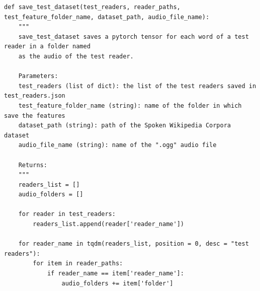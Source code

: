 \documentclass[12pt,a4paper,titlepage]{article}
\begin{document}
\begin{lstlisting}[language=iPython,firstnumber=208, caption=Funzione \texttt{save\_test\_dataset}, label=save_test_dataset,captionpos=b]
def save_test_dataset(test_readers, reader_paths, test_feature_folder_name, dataset_path, audio_file_name):
    """
    save_test_dataset saves a pytorch tensor for each word of a test reader in a folder named 
    as the audio of the test reader.

    Parameters:
    test_readers (list of dict): the list of the test readers saved in test_readers.json
    test_feature_folder_name (string): name of the folder in which save the features
    dataset_path (string): path of the Spoken Wikipedia Corpora dataset
    audio_file_name (string): name of the ".ogg" audio file 

    Returns:
    """
    readers_list = []
    audio_folders = []

    for reader in test_readers:
        readers_list.append(reader['reader_name'])

    for reader_name in tqdm(readers_list, position = 0, desc = "test readers"):
        for item in reader_paths:
            if reader_name == item['reader_name']:
                audio_folders += item['folder']


\end{lstlisting}
\end{document}
